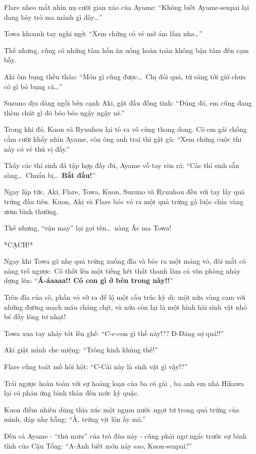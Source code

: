 \documentclass[../main.tex]{subfiles}
\begin{document}
Flare nheo mắt nhìn nụ cười gian xảo của Ayame: ``Không biết Ayame-senpai lại đang bày trò ma mãnh gì đây\dots''

Towa khoanh tay nghi ngờ: ``Xem chừng có vẻ mờ ám lắm nha\dots''

Thế nhưng, cũng có những tâm hồn ăn uống hoàn toàn không bận tâm đến cạm bẫy.

Aki ôm bụng thều thào: ``Món gì cũng được\dots\ Chị đói quá, từ sáng tới giờ chưa có gì bỏ bụng cả\dots''

Suzuno dịu dàng ngồi bên cạnh Aki, gật đầu đồng tình: ``Đúng đó, em cũng đang thèm chút gì đó béo béo ngậy ngậy nè.''

Trong khi đó, Kuon và Ryuuhou lại tỏ ra vô cùng thong dong. Cô em gái chống cằm cười khẩy nhìn Ayame, còn ông anh trai thì gật gù: ``Xem chừng cuộc thi này có vẻ thú vị đấy.''

Thấy các thí sinh đã tập hợp đầy đủ, Ayame vỗ tay ròn rã: ``Các thí sinh sẵn sàng\dots\ Chuẩn bị\dots\ \textbf{Bắt đầu!}''

Ngay lập tức, Aki, Flare, Towa, Kuon, Suzuno và Ryuuhou đều với tay lấy quả trứng đầu tiên. Kuon, Aki và Flare bóc vỏ ra một quả trứng gà luộc chín vàng ươm bình thường.

Thế nhưng, ``vận may'' lại gọi tên\dots\ nàng Ác ma Towa!

*CẠCH!*

Ngay khi Towa gõ nhẹ quả trứng xuống đĩa và bóc ra một mảng vỏ, đôi mắt cô nàng trố ngược. Cô thốt lên một tiếng hét thất thanh làm cả văn phòng nhảy dựng lên: ``\textbf{Á-áaaaa!! Có con gì ở bên trong này!!}''

Trên đĩa của cô, phần vỏ vỡ ra để lộ một cấu trúc kỳ dị: một nửa vàng cam với những đường mạch máu chăng chịt, và nửa còn lại là một hình hài sinh vật nhỏ bé đầy lông tơ nhạt!

Towa xua tay nhảy tót lên ghế: ``C-c-con gì thế này!?? Đ-Đáng sợ quá!!''

Aki giật mình che miệng: ``Trông kinh khủng thế!''

Flare cũng toát mồ hôi hột: ``C-Cái này là sinh vật gì vậy!?''

Trái ngược hoàn toàn với sự hoảng loạn của ba cô gái \hll, ba anh em nhà Hikawa lại có phản ứng bình thản đến mức kỳ quặc.

Kuon điềm nhiên dùng thìa xúc một ngụm nước ngọt từ trong quả trứng của mình, đáp nhẹ hẫng: ``À, trứng vịt lộn ấy mà.''

Đến cả Ayame - ``thủ mưu'' của trò đùa này - cũng phải ngơ ngác trước sự bình tĩnh của Cậu Tổng: ``A-Anh biết món này sao, Kuon-senpai?''
\end{document}
